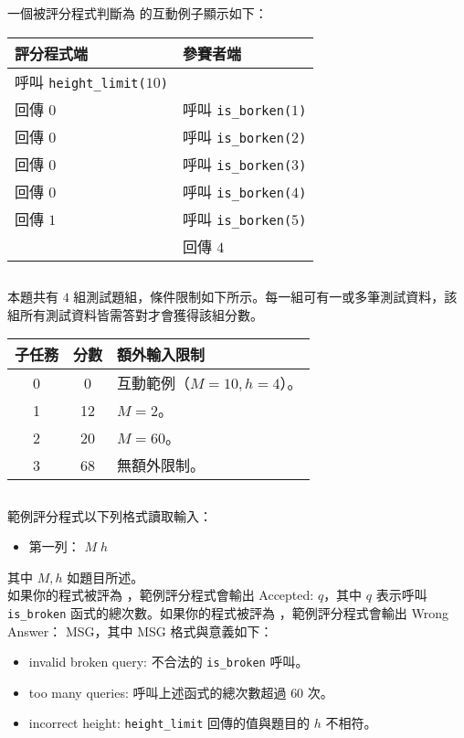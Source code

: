 一個被評分程式判斷為  的互動例子顯示如下：
\begin{center}
    \begin{tabular}[t]{@{}ll@{}}
    \toprule
    評分程式端 & 參賽者端\\
    \midrule
    呼叫 \texttt{height\_limit($10$)} & \\
    回傳 $0$ & 呼叫 \texttt{is\_borken($1$)}\\
    回傳 $0$ & 呼叫 \texttt{is\_borken($2$)}\\
    回傳 $0$ & 呼叫 \texttt{is\_borken($3$)}\\
    回傳 $0$ & 呼叫 \texttt{is\_borken($4$)}\\
    回傳 $1$ & 呼叫 \texttt{is\_borken($5$)}\\
    & 回傳 $4$\\
    \bottomrule
    \end{tabular}
\end{center}
\subsection*{}
本題共有 $4$ 組測試題組，條件限制如下所示。每一組可有一或多筆測試資料，該組所有測試資料皆需答對才會獲得該組分數。
\begin{center}
    \begin{tabular}[t]{@{}ccl@{}}
    \toprule
    子任務 & 分數 & 額外輸入限制\\
    \midrule
    0 & 0  & 互動範例（$M=10, h=4$）。\\
    1 & 12 & $M=2$。\\
    2 & 20 & $M=60$。\\
    3 & 68 & 無額外限制。\\
    \bottomrule
    \end{tabular}
\end{center}

\newpage

\subsection*{}
範例評分程式以下列格式讀取輸入：
\begin{itemize}
    \item 第一列： $M\;h$
\end{itemize}
其中 $M,h$ 如題目所述。\\

如果你的程式被評為 ，範例評分程式會輸出 Accepted: $q$，其中 $q$ 表示呼叫 \texttt{is\_broken} 函式的總次數。如果你的程式被評為 ，範例評分程式會輸出 Wrong Answer： MSG，其中 MSG 格式與意義如下：
\begin{itemize}
    \item invalid broken query: 不合法的 \texttt{is\_broken} 呼叫。
    \item too many queries: 呼叫上述函式的總次數超過 $60$ 次。
    \item incorrect height: \texttt{height\_limit} 回傳的值與題目的 $h$ 不相符。
\end{itemize}

